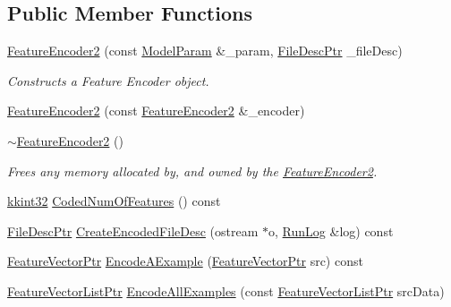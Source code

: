 \subsection*{Public Member Functions}
\begin{DoxyCompactItemize}
\item 
\hyperlink{class_k_k_m_l_l_1_1_feature_encoder2_a963351c535276de1fa40d992a327415c}{Feature\+Encoder2} (const \hyperlink{class_k_k_m_l_l_1_1_model_param}{Model\+Param} \&\+\_\+param, \hyperlink{namespace_k_k_m_l_l_aa0d0b6ab4ec18868a399b8455b05d914}{File\+Desc\+Ptr} \+\_\+file\+Desc)
\begin{DoxyCompactList}\small\item\em Constructs a Feature Encoder object. \end{DoxyCompactList}\item 
\hyperlink{class_k_k_m_l_l_1_1_feature_encoder2_ad4fec95a705647880c1d6e2bf30bf1da}{Feature\+Encoder2} (const \hyperlink{class_k_k_m_l_l_1_1_feature_encoder2}{Feature\+Encoder2} \&\+\_\+encoder)
\item 
\hyperlink{class_k_k_m_l_l_1_1_feature_encoder2_a3e85e08fa5117b35634adae5dc8bc6dc}{$\sim$\+Feature\+Encoder2} ()
\begin{DoxyCompactList}\small\item\em Frees any memory allocated by, and owned by the \hyperlink{class_k_k_m_l_l_1_1_feature_encoder2}{Feature\+Encoder2}. \end{DoxyCompactList}\item 
\hyperlink{namespace_k_k_b_a8fa4952cc84fda1de4bec1fbdd8d5b1b}{kkint32} \hyperlink{class_k_k_m_l_l_1_1_feature_encoder2_ac84f8e89a69256abcb7807f8c0f3aae4}{Coded\+Num\+Of\+Features} () const 
\item 
\hyperlink{namespace_k_k_m_l_l_aa0d0b6ab4ec18868a399b8455b05d914}{File\+Desc\+Ptr} \hyperlink{class_k_k_m_l_l_1_1_feature_encoder2_aa181a5ec394867a56583a701fc429eb4}{Create\+Encoded\+File\+Desc} (ostream $\ast$o, \hyperlink{class_k_k_b_1_1_run_log}{Run\+Log} \&log) const 
\item 
\hyperlink{namespace_k_k_m_l_l_a0c5df3d48f45926fbc4fee04f5e3bc04}{Feature\+Vector\+Ptr} \hyperlink{class_k_k_m_l_l_1_1_feature_encoder2_ab1b04a29d5bd9338a4564af04fab8dda}{Encode\+A\+Example} (\hyperlink{namespace_k_k_m_l_l_a0c5df3d48f45926fbc4fee04f5e3bc04}{Feature\+Vector\+Ptr} src) const 
\item 
\hyperlink{namespace_k_k_m_l_l_acf2ba92a3cf03e2b19674b24ff488ef6}{Feature\+Vector\+List\+Ptr} \hyperlink{class_k_k_m_l_l_1_1_feature_encoder2_a094b269cb4d1dd3a8a6930185423e45d}{Encode\+All\+Examples} (const \hyperlink{namespace_k_k_m_l_l_acf2ba92a3cf03e2b19674b24ff488ef6}{Feature\+Vector\+List\+Ptr} src\+Data)

\end{DoxyCompactItemize}
